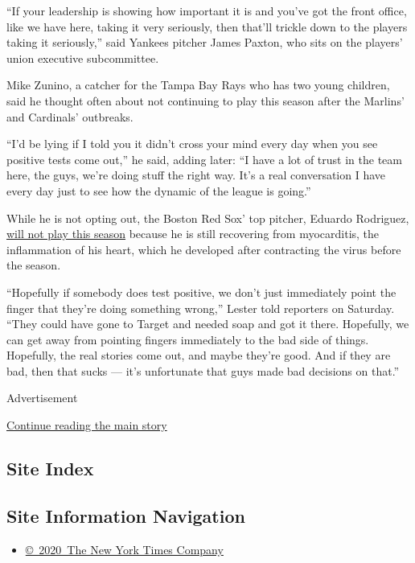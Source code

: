 ``If your leadership is showing how important it is and you've got the
front office, like we have here, taking it very seriously, then that'll
trickle down to the players taking it seriously,'' said Yankees pitcher
James Paxton, who sits on the players' union executive subcommittee.

Mike Zunino, a catcher for the Tampa Bay Rays who has two young
children, said he thought often about not continuing to play this season
after the Marlins' and Cardinals' outbreaks.

``I'd be lying if I told you it didn't cross your mind every day when
you see positive tests come out,'' he said, adding later: ``I have a lot
of trust in the team here, the guys, we're doing stuff the right way.
It's a real conversation I have every day just to see how the dynamic of
the league is going.''

While he is not opting out, the Boston Red Sox' top pitcher, Eduardo
Rodriguez,
\href{https://www.masslive.com/redsox/2020/08/eduardo-rodriguez-boston-red-sox-starter-out-for-season-with-heart-ailment.html}{will
not play this season} because he is still recovering from myocarditis,
the inflammation of his heart, which he developed after contracting the
virus before the season.

``Hopefully if somebody does test positive, we don't just immediately
point the finger that they're doing something wrong,'' Lester told
reporters on Saturday. ``They could have gone to Target and needed soap
and got it there. Hopefully, we can get away from pointing fingers
immediately to the bad side of things. Hopefully, the real stories come
out, and maybe they're good. And if they are bad, then that sucks ---
it's unfortunate that guys made bad decisions on that.''

Advertisement

\protect\hyperlink{after-bottom}{Continue reading the main story}

\hypertarget{site-index}{%
\subsection{Site Index}\label{site-index}}

\hypertarget{site-information-navigation}{%
\subsection{Site Information
Navigation}\label{site-information-navigation}}

\begin{itemize}
\tightlist
\item
  \href{https://help.nytimes.com/hc/en-us/articles/115014792127-Copyright-notice}{©~2020~The
  New York Times Company}
\end{itemize}

